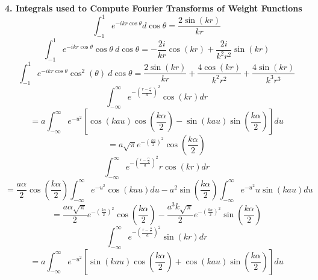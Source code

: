 \documentclass[double,12pt]{beavtex}
\begin{document}
\textbf{4. Integrals used to Compute Fourier Transforms of Weight Functions}
\begin{equation}{\int_{-1}^{1}{e^{-ikr\cos{\theta}}d{\cos{\theta}}}=\frac{2\sin(kr)}{kr}}\end{equation} 
\begin{equation}{\int_{-1}^{1}{e^{-ikr\cos{\theta}}\cos{\theta}{~}d{\cos{\theta}}}=-\frac{2i}{kr}\cos(kr)+\frac{2i}{k^2r^2}\sin(kr)}\end{equation} 
\[{}\]
\begin{equation}{\int_{-1}^{1}{e^{-ikr\cos{\theta}}\cos^2(\theta)~d{\cos{\theta}}}=\frac{2\sin(kr)}{kr}+\frac{4\cos(kr)}{k^2r^2}+\frac{4\sin(kr)}{k^3r^3}}\end{equation} 
\[{}\]
\[{}\]
\begin{equation}{\int_{-\infty}^{\infty}{e^{-\left(\frac{r-\frac{\alpha}{2}}{a}\right)^2}\cos(kr)d{r}}}\end{equation}
\begin{displaymath}{=a\int_{-\infty}^{\infty}{e^{-u^2}\left[\cos(kau)\cos(\frac{k\alpha}{2})-\sin(kau)\sin(\frac{k\alpha}{2})\right]d{u}}}\end{displaymath}  
\begin{equation}{=a\sqrt{\pi}e^{-\left(\frac{ka}{2}\right)^2}\cos(\frac{k\alpha}{2})}\end{equation} 
\[{}\]
\[{}\]
\begin{equation}{\int_{-\infty}^{\infty}{e^{-\left(\frac{r-\frac{\alpha}{2}}{a}\right)^2}r\cos(kr)d{r}}}\end{equation}
\begin{equation}{=\frac{a\alpha}{2}\cos\left(\frac{k\alpha}{2}\right)\int_{-\infty}^{\infty}{e^{-u^2}\cos(kau)d{u}} -a^2\sin\left(\frac{k\alpha}{2}\right)\int_{-\infty}^{\infty}{e^{-u^2}u\sin(kau)d{u}}}\end{equation}
\begin{equation}{=\frac{a\alpha\sqrt{\pi}}{2}e^{-\left(\frac{ka}{2}\right)^2}\cos\left(\frac{k\alpha}{2}\right)-\frac{a^3k\sqrt{\pi}}{2}e^{-\left(\frac{ka}{2}\right)^2}\sin\left(\frac{k\alpha}{2}\right)}\end{equation}
\[{}\]
\begin{equation}{\int_{-\infty}^{\infty}{e^{-\left(\frac{r-\frac{\alpha}{2}}{a}\right)^2}\sin(kr)d{r}}}\end{equation} 
\begin{displaymath}{=a\int_{-\infty}^{\infty}{e^{-u^2}\left[\sin(kau)\cos(\frac{k\alpha}{2})+\cos(kau)\sin(\frac{k\alpha}{2})\right]d{u}}}\end{displaymath}  
\end{document}

